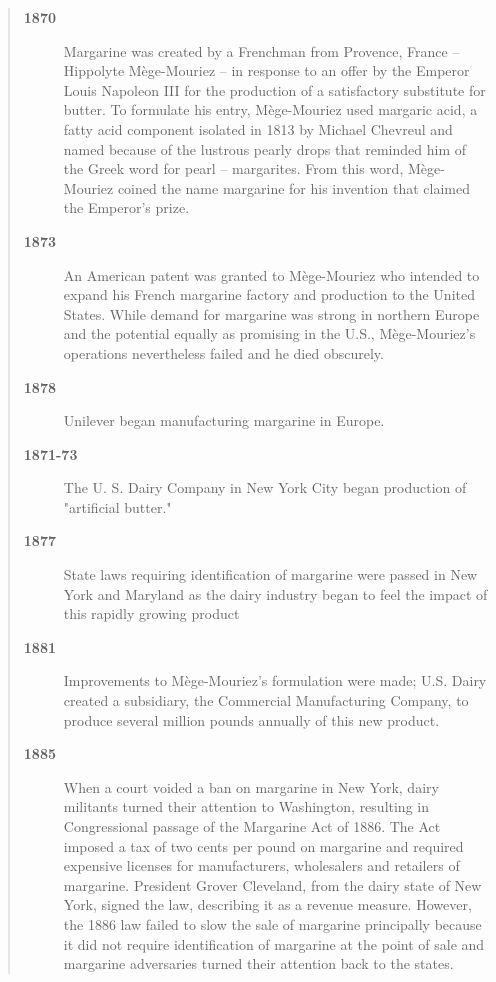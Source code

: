 \documentclass[mnsc,blindrev]{informs3}
\begin{document}
\begin{quotation}

\begin{description}

\item[\bf 1870] Margarine was created by a Frenchman from Provence,
France -- Hippolyte M\`ege-Mouriez -- in response to an offer by
the Emperor Louis Napoleon III for the production of a satisfactory
substitute for butter. To formulate his entry, M\`ege-Mouriez used
margaric acid, a fatty acid component isolated in 1813 by Michael
Chevreul and named because of the lustrous pearly drops that reminded
him of the Greek word for pearl -- margarites. From this word,
M\`ege-Mouriez coined the name margarine for his invention that
claimed the Emperor's prize.

\item[\bf 1873] An American patent was granted to M\`ege-Mouriez who
intended to expand his French margarine factory and production to
the United States. While demand for margarine was strong in northern
Europe and the potential equally as promising in the U.S.,
M\`ege-Mouriez's operations nevertheless failed and he died obscurely.

\item[\bf 1878] Unilever began manufacturing margarine in Europe.

\item[\bf 1871-73] The U. S. Dairy Company in New York City began
production of "artificial butter."

\item[\bf 1877] State laws requiring identification of margarine were
passed in New York and Maryland as the dairy industry began to feel
the impact of this rapidly growing product

\item[\bf 1881] Improvements to M\`ege-Mouriez's formulation were made;
U.S. Dairy created a subsidiary, the Commercial Manufacturing Company,
to produce several million pounds annually of this new product.

\item[\bf 1885] When a court voided a ban on margarine in New York,
dairy militants turned their attention to Washington, resulting in
Congressional passage of the Margarine Act of 1886. The Act imposed
a tax of two cents per pound on margarine and required expensive
licenses for manufacturers, wholesalers and retailers of margarine.
President Grover Cleveland, from the dairy state of New York, signed
the law, describing it as a revenue measure. However, the 1886 law
failed to slow the sale of margarine principally because it did not
require identification of margarine at the point of sale and
margarine adversaries turned their attention back to the states.


\end{description}
\end{quotation}
\end{document}
